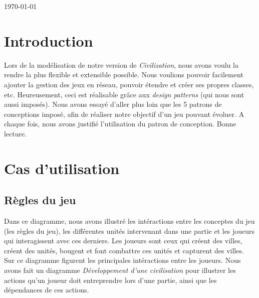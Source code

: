 \begin{titlepage}

{\large \today}\\[3cm] %


 

\vfill %

\end{titlepage}

\tableofcontent

\section{Introduction}

	Lors de la modélisation de notre version de \textit{Civilization}, nous avons voulu la rendre la plus flexible et extensible possible.
Nous voulions pouvoir facilement ajouter la gestion des jeux en réseau, pouvoir étendre et créer ses propres classes, etc.
Heureusement, ceci est réalisable grâce aux \textit{design patterns} (qui nous sont aussi imposés).
Nous avons essayé d'aller plus loin que les 5 patrons de conceptions imposé, afin de réaliser notre objectif d'un jeu pouvant évoluer.
A chaque fois, nous avons justifié l'utilisation du patron de conception.
	Bonne lecture.

\section{Cas d'utilisation}
	\subsection{Règles du jeu}
	Dans ce diagramme, nous avons illustré les intéractions entre les conceptes du jeu (les règles du jeu), les différentes unités intervenant dans une partie et les joueurs qui interagissent avec ces derniers.
	Les joueurs sont ceux qui créent des villes, créent des unités, bougent et font combattre ces unités et capturent des villes.
	Sur ce diagramme figurent les principales intéractions entre les joueurs.
	Nous avons fait un diagramme \textit{Développement d'une civilisation} pour illustrer les actions qu'un joueur doit entreprendre lors d'une partie, ainsi que les dépendances de ces actions.
	
